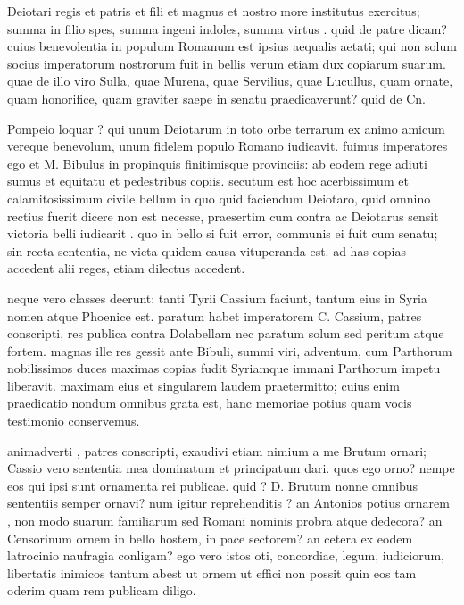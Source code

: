  Deiotari regis et patris et fili et magnus et nostro more institutus exercitus; summa in filio spes, summa ingeni indoles, summa virtus . quid de patre dicam? cuius benevolentia in populum Romanum est ipsius aequalis aetati; qui non solum socius imperatorum nostrorum fuit in bellis verum etiam dux copiarum suarum. quae de illo viro Sulla, quae Murena, quae Servilius, quae Lucullus, quam ornate, quam honorifice, quam graviter saepe in senatu praedicaverunt? quid de Cn.

 Pompeio loquar ? qui unum Deiotarum in toto orbe terrarum ex animo amicum vereque benevolum, unum fidelem populo Romano iudicavit. fuimus imperatores ego et M. Bibulus in propinquis finitimisque provinciis: ab eodem rege adiuti sumus et equitatu et pedestribus copiis. secutum est hoc acerbissimum et calamitosissimum civile bellum in quo quid faciendum Deiotaro, quid omnino rectius fuerit dicere non est necesse, praesertim cum contra ac Deiotarus sensit victoria belli iudicarit . quo in bello si fuit error, communis ei fuit cum senatu; sin recta sententia, ne victa quidem causa vituperanda est. ad has copias accedent alii reges, etiam dilectus accedent.

 neque vero classes deerunt: tanti Tyrii Cassium faciunt, tantum eius in Syria nomen atque Phoenice est. paratum habet imperatorem C. Cassium, patres conscripti, res publica contra Dolabellam nec paratum solum sed peritum atque fortem. magnas ille res gessit ante Bibuli, summi viri, adventum, cum Parthorum nobilissimos duces maximas copias fudit Syriamque immani Parthorum impetu liberavit. maximam eius et singularem laudem praetermitto; cuius enim praedicatio nondum omnibus grata est, hanc memoriae potius quam vocis testimonio conservemus.

 animadverti , patres conscripti, exaudivi etiam nimium a me Brutum ornari; Cassio vero sententia mea dominatum et principatum dari. quos ego orno? nempe eos qui ipsi sunt ornamenta rei publicae. quid ? D. Brutum nonne omnibus sententiis semper ornavi? num igitur reprehenditis ? an Antonios potius ornarem , non modo suarum familiarum sed Romani nominis probra atque dedecora? an Censorinum ornem in bello hostem, in pace sectorem? an cetera ex eodem latrocinio naufragia conligam? ego vero istos oti, concordiae, legum, iudiciorum, libertatis inimicos tantum abest ut ornem ut effici non possit quin eos tam oderim quam rem publicam diligo.


